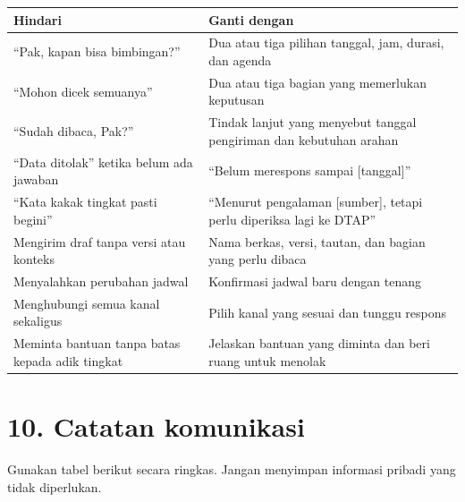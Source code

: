 \documentclass[
  indonesian,
]{article}
\newcounter{none} %
\begin{document}
{\def\LTcaptype{none} %
\begin{longtable}[]{@{}
  >{\raggedright\arraybackslash}p{}
  >{\raggedright\arraybackslash}p{}@{}}
\toprule\noalign{}
\begin{minipage}[b]{\linewidth}\raggedright
Hindari
\end{minipage} & \begin{minipage}[b]{\linewidth}\raggedright
Ganti dengan
\end{minipage} \\
\midrule\noalign{}
\endhead
\bottomrule\noalign{}
\endlastfoot
``Pak, kapan bisa bimbingan?'' & Dua atau tiga pilihan tanggal, jam,
durasi, dan agenda \\
``Mohon dicek semuanya'' & Dua atau tiga bagian yang memerlukan
keputusan \\
``Sudah dibaca, Pak?'' & Tindak lanjut yang menyebut tanggal pengiriman
dan kebutuhan arahan \\
``Data ditolak'' ketika belum ada jawaban & ``Belum merespons sampai
{[}tanggal{]}'' \\
``Kata kakak tingkat pasti begini'' & ``Menurut pengalaman {[}sumber{]},
tetapi perlu diperiksa lagi ke DTAP'' \\
Mengirim draf tanpa versi atau konteks & Nama berkas, versi, tautan, dan
bagian yang perlu dibaca \\
Menyalahkan perubahan jadwal & Konfirmasi jadwal baru dengan tenang \\
Menghubungi semua kanal sekaligus & Pilih kanal yang sesuai dan tunggu
respons \\
Meminta bantuan tanpa batas kepada adik tingkat & Jelaskan bantuan yang
diminta dan beri ruang untuk menolak \\
\end{longtable}
}

\section{10. Catatan komunikasi}\label{catatan-komunikasi}

Gunakan tabel berikut secara ringkas. Jangan menyimpan informasi pribadi
yang tidak diperlukan.
\end{document}
